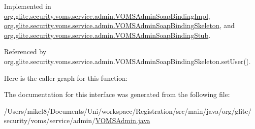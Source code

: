 Implemented in \hyperlink{classorg_1_1glite_1_1security_1_1voms_1_1service_1_1admin_1_1VOMSAdminSoapBindingImpl_ae2169346cd25a45e4090ddb4e4871490}{org.glite.security.voms.service.admin.VOMSAdminSoapBindingImpl}, \hyperlink{classorg_1_1glite_1_1security_1_1voms_1_1service_1_1admin_1_1VOMSAdminSoapBindingSkeleton_a9d845ebe4d2924b9a4acadb3b9109833}{org.glite.security.voms.service.admin.VOMSAdminSoapBindingSkeleton}, and \hyperlink{classorg_1_1glite_1_1security_1_1voms_1_1service_1_1admin_1_1VOMSAdminSoapBindingStub_ab4ef2d658fb90f3076affbe82658e660}{org.glite.security.voms.service.admin.VOMSAdminSoapBindingStub}.



Referenced by org.glite.security.voms.service.admin.VOMSAdminSoapBindingSkeleton.setUser().



Here is the caller graph for this function:




The documentation for this interface was generated from the following file:\begin{DoxyCompactItemize}
\item 
/Users/mikel8/Documents/Uni/workspace/Registration/src/main/java/org/glite/security/voms/service/admin/\hyperlink{VOMSAdmin_8java}{VOMSAdmin.java}\end{DoxyCompactItemize}
